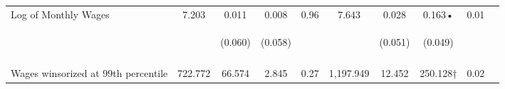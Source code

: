 \begin{tabular}{lccccccccc}
\noalign{\smallskip}Log of Monthly Wages & 7.203 & 0.011 & 0.008 & 0.96 & 7.643 & 0.028 & 0.163• & 0.01 & \\
 & \begin{footnotesize}\end{footnotesize} & \begin{footnotesize}(0.060)\end{footnotesize} & \begin{footnotesize}(0.058)\end{footnotesize} & \begin{footnotesize}\end{footnotesize} & \begin{footnotesize}\end{footnotesize} & \begin{footnotesize}(0.051)\end{footnotesize} & \begin{footnotesize}(0.049)\end{footnotesize} & \begin{footnotesize}\end{footnotesize} & \begin{footnotesize}\end{footnotesize}\\
 & \begin{footnotesize}\end{footnotesize} & \begin{footnotesize}[0.612]\end{footnotesize} & \begin{footnotesize}[1.000]\end{footnotesize} & \begin{footnotesize}\end{footnotesize} & \begin{footnotesize}\end{footnotesize} & \begin{footnotesize}[1.000]\end{footnotesize} & \begin{footnotesize}[0.006]\end{footnotesize} & \begin{footnotesize}\end{footnotesize} & \begin{footnotesize}\end{footnotesize}\\
\noalign{\smallskip}Wages winsorized at 99th percentile & 722.772 & 66.574 & 2.845 & 0.27 & 1,197.949 & 12.452 & 250.128† & 0.02 & \\

\end{tabular}
